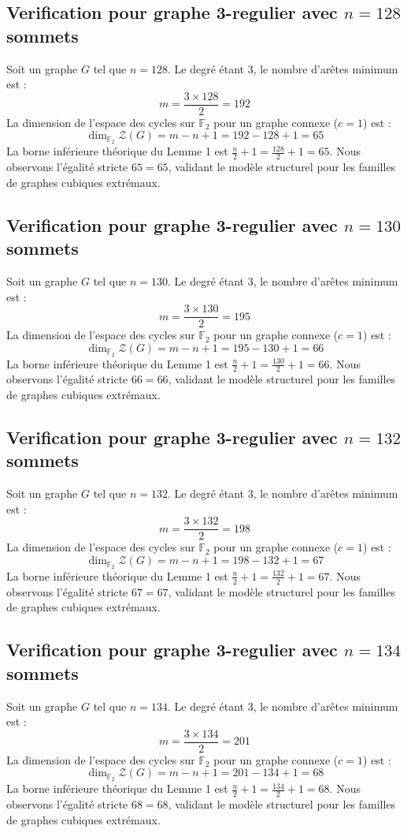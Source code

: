 \documentclass[11pt,a4paper]{article}
\begin{document}
\subsection{Verification pour graphe 3-regulier avec $n=128$ sommets}
Soit un graphe $G$ tel que $n = 128$. Le degré étant 3, le nombre d'arêtes minimum est :
$$ m = \frac{3 \times 128}{2} = 192 $$
La dimension de l'espace des cycles sur $\mathbb{F}_2$ pour un graphe connexe ($c=1$) est :
$$ \dim_{\mathbb{F}_2} \mathcal{Z}(G) = m - n + 1 = 192 - 128 + 1 = 65 $$
La borne inférieure théorique du Lemme 1 est $\frac{n}{2} + 1 = \frac{128}{2} + 1 = 65$.
Nous observons l'égalité stricte $65 = 65$, validant le modèle structurel pour les familles de graphes cubiques extrémaux.

\subsection{Verification pour graphe 3-regulier avec $n=130$ sommets}
Soit un graphe $G$ tel que $n = 130$. Le degré étant 3, le nombre d'arêtes minimum est :
$$ m = \frac{3 \times 130}{2} = 195 $$
La dimension de l'espace des cycles sur $\mathbb{F}_2$ pour un graphe connexe ($c=1$) est :
$$ \dim_{\mathbb{F}_2} \mathcal{Z}(G) = m - n + 1 = 195 - 130 + 1 = 66 $$
La borne inférieure théorique du Lemme 1 est $\frac{n}{2} + 1 = \frac{130}{2} + 1 = 66$.
Nous observons l'égalité stricte $66 = 66$, validant le modèle structurel pour les familles de graphes cubiques extrémaux.

\subsection{Verification pour graphe 3-regulier avec $n=132$ sommets}
Soit un graphe $G$ tel que $n = 132$. Le degré étant 3, le nombre d'arêtes minimum est :
$$ m = \frac{3 \times 132}{2} = 198 $$
La dimension de l'espace des cycles sur $\mathbb{F}_2$ pour un graphe connexe ($c=1$) est :
$$ \dim_{\mathbb{F}_2} \mathcal{Z}(G) = m - n + 1 = 198 - 132 + 1 = 67 $$
La borne inférieure théorique du Lemme 1 est $\frac{n}{2} + 1 = \frac{132}{2} + 1 = 67$.
Nous observons l'égalité stricte $67 = 67$, validant le modèle structurel pour les familles de graphes cubiques extrémaux.

\subsection{Verification pour graphe 3-regulier avec $n=134$ sommets}
Soit un graphe $G$ tel que $n = 134$. Le degré étant 3, le nombre d'arêtes minimum est :
$$ m = \frac{3 \times 134}{2} = 201 $$
La dimension de l'espace des cycles sur $\mathbb{F}_2$ pour un graphe connexe ($c=1$) est :
$$ \dim_{\mathbb{F}_2} \mathcal{Z}(G) = m - n + 1 = 201 - 134 + 1 = 68 $$
La borne inférieure théorique du Lemme 1 est $\frac{n}{2} + 1 = \frac{134}{2} + 1 = 68$.
Nous observons l'égalité stricte $68 = 68$, validant le modèle structurel pour les familles de graphes cubiques extrémaux.
\end{document}
